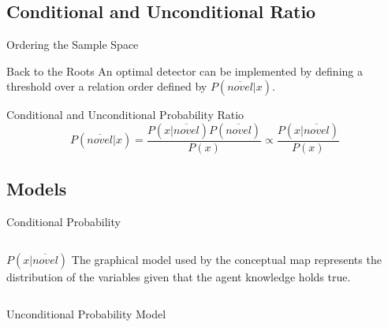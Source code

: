 \documentclass[compress]{beamer}
\begin{document}
\subsection{Conditional and Unconditional Ratio}
\begin{frame}{Ordering the Sample Space}

\begin{block}{Back to the Roots}
An optimal detector can be implemented by defining a threshold over a
relation order defined by $P(\overline{novel}|x)$.
\end{block}
\vfill

\begin{block}{Conditional and Unconditional Probability Ratio}
\[P(\overline{novel}|x) = \frac{P(x|\overline{novel})P(\overline{novel})}{P(x)} \propto \frac{P(x|\overline{novel})}{P(x)}\]
\end{block}
\end{frame}

\subsection{Models}
\begin{frame}{Conditional Probability}
\begin{columns}[c]
    
    \begin{block}{$P(x|\overline{novel})$}
      The graphical model used by the conceptual map represents the distribution of the
      variables given that the agent knowledge holds true.

    \end{block}
\end{columns}
\end{frame}

\begin{frame}{Unconditional Probability Model}
\end{frame}
\end{document}
